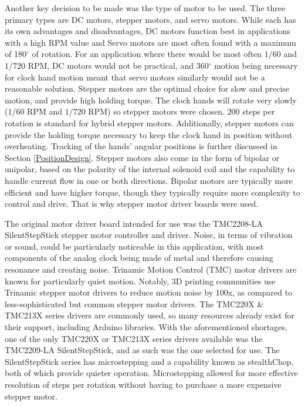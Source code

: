 \documentclass[11pt]{article}
\begin{document}
Another key decision to be made was the type of motor to be used. 
The three primary types are DC motors, stepper motors, and servo motors.  
While each has its own advantages and disadvantages, DC motors function best in applications with a high RPM value and Servo motors are most often found with a maximum of 180$^{\circ}$ of rotation. 
For an application where there would be most often $1/60$ and $1/720$ RPM, DC motors would not be practical, and 360$^{\circ}$ motion being necessary for clock hand motion meant that servo motors similarly would not be a reasonable solution. 
Stepper motors are the optimal choice for slow and precise motion, and provide high holding torque. 
The clock hands will rotate very slowly ($1/60$ RPM and $1/720$ RPM) so stepper motors were chosen.
200 steps per rotation is standard for hybrid stepper motors. 
Additionally, stepper motors can provide the holding torque necessary to keep the clock hand in position without overheating.
Tracking of the hands' angular positions is further discussed in Section \ref{PositionDesign}. 
Stepper motors also come in the form of bipolar or unipolar, based on the polarity of the internal solenoid coil and the capability to handle current flow in one or both directions. 
Bipolar motors are typically more efficient and have higher torque, though they typically require more complexity to control and drive. 
That is why stepper motor driver boards were used.


The original motor driver board intended for use was the TMC2208-LA SilentStepStick stepper motor controller and driver. 
Noise, in terms of vibration or sound, could be particularly noticeable in this application, with most components of the analog clock being made of metal and therefore causing resonance and creating noise. 
Trinamic Motion Control (TMC) motor drivers are known for particularly quiet motion.
Notably, 3D printing communities use Trinamic stepper motor drivers to reduce motion noise by 100x, as compared to less-sophisticated but common stepper motor drivers.
The TMC220X \& TMC213X series drivers are commonly used, so many resources already exist for their support, including Arduino libraries. 
With the aforementioned shortages, one of the only TMC220X or TMC213X series drivers available was the TMC2209-LA SilentStepStick, and as such was the one selected for use. 
The SilentStepStick series has microstepping and a capability known as stealthChop, both of which provide quieter operation. Microstepping allowed for more effective resolution of steps per rotation without having to purchase a more expensive stepper motor.  
\end{document}
